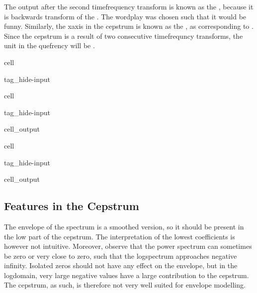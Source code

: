 \documentclass[letterpaper,10pt,english]{jupyterBook}
\begin{document}
\sphinxAtStartPar
The output after the second time\sphinxhyphen{}frequency transform is known as the , because it is backwards transform of the . The word\sphinxhyphen{}play was chosen such that it would be funny. Similarly, the x\sphinxhyphen{}axis in the cepstrum is known as the , as corresponding to . Since the cepstrum is a result of two consecutive time\sphinxhyphen{}frequncy transforms, the unit in the quefrency will be .

\begin{sphinxuseclass}{cell}
\begin{sphinxuseclass}{tag_hide-input}
\end{sphinxuseclass}
\end{sphinxuseclass}
\begin{sphinxuseclass}{cell}
\begin{sphinxuseclass}{tag_hide-input}\begin{sphinxVerbatimOutput}

\begin{sphinxuseclass}{cell_output}
\noindent{}

\end{sphinxuseclass}\end{sphinxVerbatimOutput}

\end{sphinxuseclass}
\end{sphinxuseclass}
\begin{sphinxuseclass}{cell}
\begin{sphinxuseclass}{tag_hide-input}\begin{sphinxVerbatimOutput}

\begin{sphinxuseclass}{cell_output}
\noindent{}

\end{sphinxuseclass}\end{sphinxVerbatimOutput}

\end{sphinxuseclass}
\end{sphinxuseclass}

\subsection{Features in the Cepstrum}
\label{\detokenize{Representations/Melcepstrum:features-in-the-cepstrum}}
\sphinxAtStartPar
The envelope of the spectrum is a smoothed version, so it should be present in the low part of the cepstrum. The interpretation of the lowest coefficients is however not intuitive. Moreover, observe that the power spectrum can sometimes be zero or very close to zero, such that the log\sphinxhyphen{}spectrum approaches negative infinity. Isolated zeros should not have any effect on the envelope, but in the log\sphinxhyphen{}domain, very large negative values have a large contribution to the cepstrum. The cepstrum, as such, is therefore not very well suited for envelope modelling.
\end{document}
